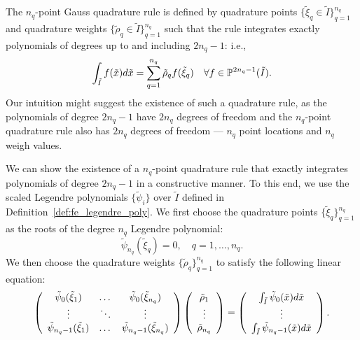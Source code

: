 The $n_q$-point Gauss quadrature rule is defined by quadrature points $\{\tilde \xi_q \in \tilde I \}_{q=1}^{n_q}$ and quadrature weights $\{ \tilde \rho_q \in \tilde I \}_{q=1}^{n_q}$ such that the rule integrates exactly polynomials of degrees up to and including $2n_q - 1$: i.e.,
\begin{equation}
  \int_{\tilde I} f(\tilde x) d\tilde x = \sum_{q=1}^{n_q} \tilde \rho_q f(\tilde \xi_q) \quad \forall f \in \PP^{2n_q-1}(\tilde I).
  \label{eq:fe_impl_gauss_cond}
\end{equation}
Our intuition might suggest the existence of such a quadrature rule, as the polynomials of degree $2n_q-1$ have $2n_q$ degrees of freedom and the $n_q$-point quadrature rule also has $2n_q$ degrees of freedom --- $n_q$ point locations and $n_q$ weigh values.


We can show the existence of a $n_q$-point quadrature rule that exactly integrates polynomials of degree $2n_q-1$ in a constructive manner.  To this end, we use the scaled Legendre polynomials $\{ \tilde \psi_i \}$ over $\tilde I$ defined in Definition~\ref{def:fe_legendre_poly}. We first choose the quadrature points $\{ \tilde \xi_q \}_{q=1}^{n_q}$ as the roots of the degree $n_q$ Legendre polynomial:
\begin{equation}
  \tilde \psi_{n_q}(\tilde \xi_q) = 0, \quad q = 1,\dots,n_q.
  \label{eq:fe_impl_gauss_points}
\end{equation}
We then choose the quadrature weights $\{\tilde \rho_q \}_{q=1}^{n_q}$ to satisfy the following linear equation:
\begin{equation}
  \bmat{ccc}
  \tilde \psi_0(\tilde \xi_1) & \dots & \tilde \psi_0(\tilde \xi_{n_q}) \\
  \vdots & \ddots & \vdots \\
  \tilde \psi_{n_q-1}(\tilde \xi_1) & \dots & \tilde \psi_{n_q-1}(\tilde \xi_{n_q}) 
  \emat
  \bmat{c}
  \tilde \rho_1 \\ \vdots \\ \tilde \rho_{n_q}
  \emat
  =
  \bmat{c}
  \int_{\tilde I} \tilde \psi_0(\tilde x) d\tilde x \\
  \vdots \\
  \int_{\tilde I} \tilde \psi_{n_q-1}(\tilde x) d\tilde x
  \emat .
  \label{eq:fe_impl_gauss_weights}
\end{equation}

